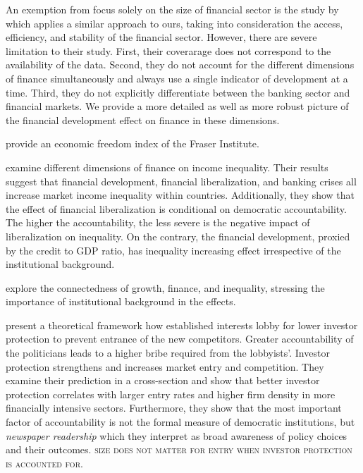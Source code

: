 \documentclass[a4paper,11pt]{article}
\begin{document}
An exemption from focus solely on the size of financial sector is the study by \citet{naceurzhang2016} which applies a similar approach to ours, taking into consideration the access, efficiency, and stability of the financial sector. However, there are severe limitation to their study. First, their coverarage does not correspond to the availability of the data. Second, they do not account for the different dimensions of finance simultaneously and always use a single indicator of development at a time. Third, they do not explicitly differentiate between the banking sector and financial markets. We provide a more detailed as well as more robust picture of the financial development effect on finance in these dimensions.

\citet{gwartney2017} provide an economic freedom index of the Fraser Institute.

\citet{de2017finance} examine different dimensions of finance on income inequality. Their results suggest that financial development, financial liberalization, and banking crises all increase market income inequality within countries. Additionally, they show that the effect of financial liberalization is conditional on democratic accountability. The higher the accountability, the less severe is the negative impact of liberalization on inequality. On the contrary, the financial development, proxied by the credit to GDP ratio, has inequality increasing effect irrespective of the institutional background.

\citet{claessens2007finance} explore the connectedness of growth, finance, and inequality, stressing the importance of institutional background in the effects.  

\citet{perotti2007investor} present a theoretical framework how established interests lobby for lower investor protection to prevent entrance of the new competitors. Greater accountability of the politicians leads to a higher bribe required from the lobbyists'. Investor protection strengthens and increases market entry and competition. They examine their prediction in a cross-section and show that better investor protection correlates with larger entry rates and higher firm density in more financially intensive sectors. Furthermore, they show that the most important factor of accountability is not the formal measure of democratic institutions, but \emph{newspaper readership} which they interpret as broad awareness of policy choices and their outcomes. \textsc{size does not matter for entry when investor protection is accounted for}.
\end{document}
